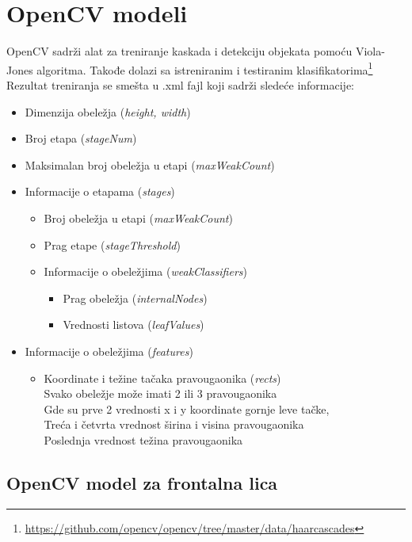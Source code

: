 \section{OpenCV modeli}

OpenCV sadrži alat za treniranje kaskada i detekciju objekata pomoću
Viola-Jones algoritma.
Takođe dolazi sa istreniranim i testiranim
klasifikatorima\footnote{\url{https://github.com/opencv/opencv/tree/master/data/haarcascades}}
\cite{OpenCV_docs} \\

\noindent
Rezultat treniranja se smešta u .xml fajl koji sadrži sledeće informacije:

\begin{itemize}
	\item Dimenzija obeležja (\emph{height, width})
	\item Broj etapa (\emph{stageNum})
	\item Maksimalan broj obeležja u etapi (\emph{maxWeakCount})
	\item Informacije o etapama (\emph{stages})
    \begin{itemize}
    \item Broj obeležja u etapi (\emph{maxWeakCount})
    \item Prag etape (\emph{stageThreshold})
    \item Informacije o obeležjima (\emph{weakClassifiers})
      \begin{itemize}
      \item Prag obeležja (\emph{internalNodes})
      \item Vrednosti listova (\emph{leafValues})
      \end{itemize}
    \end{itemize}
	\item Informacije o obeležjima (\emph{features})
    \begin{itemize}
    \item Koordinate i težine tačaka pravougaonika (\emph{rects}) \\
      Svako obeležje može imati 2 ili 3 pravougaonika \\
      Gde su prve 2 vrednosti x i y koordinate gornje leve tačke, \\
      Treća i četvrta vrednost širina i visina pravougaonika  \\
      Poslednja vrednost težina pravougaonika
    \end{itemize}
\end{itemize}

\subsection{OpenCV model za frontalna lica}

